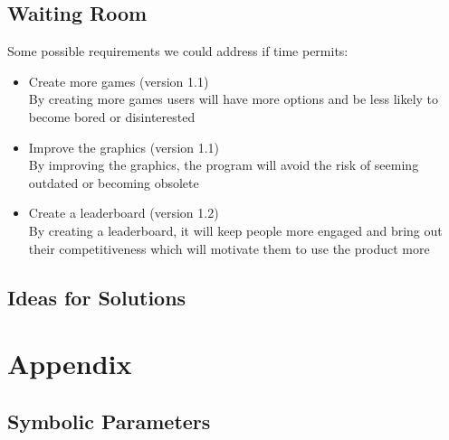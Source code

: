 \documentclass{article}
\begin{document}
		\subsection{Waiting Room}		
		\indent Some possible requirements we could address if time permits:\\
		\begin{itemize}
			\itemsep0em
			\item Create more games (version 1.1)\\
			By creating more games users will have more options and be less likely to
			become bored or disinterested
			\item Improve the graphics (version 1.1) \\
			By improving the graphics, the program will avoid the risk of seeming
			outdated or becoming obsolete
			\item Create a leaderboard (version 1.2)\\
			By creating a leaderboard, it will keep people more engaged and bring out
			their competitiveness which will motivate them to use the product more
		\end{itemize}		
		\subsection{Ideas for Solutions}
		
	\newpage
	\section{Appendix}
	\subsection{Symbolic Parameters}
		
\end{document}
